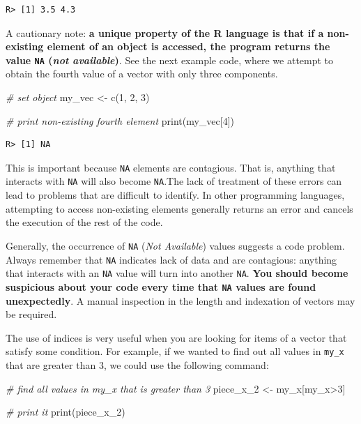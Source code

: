 \documentclass[
  12pt,
]{book}
\newenvironment{Shaded}{\begin{snugshade}}{\end{snugshade}}
\newcommand{\CommentTok}[1]{\textcolor[rgb]{0.37,0.37,0.37}{\textit{#1}}}
\newcommand{\DecValTok}[1]{\textcolor[rgb]{0.06,0.06,0.06}{#1}}
\newcommand{\FunctionTok}[1]{\textcolor[rgb]{0,0,0}{#1}}
\newcommand{\NormalTok}[1]{#1}
\newcommand{\OtherTok}[1]{\textcolor[rgb]{0.37,0.37,0.37}{#1}}
\newcommand{\SpecialCharTok}[1]{\textcolor[rgb]{0,0,0}{#1}}
\newenvironment{rmdimportant}
{\begin{importantblock}
		
	} {\end{importantblock}}
\begin{document}
\begin{verbatim}
R> [1] 3.5 4.3
\end{verbatim}

A cautionary note: \textbf{a unique property of the R language is that if a non-existing element of an object is accessed, the program returns the value \texttt{NA} (\emph{not available})}. See the next example code, where we attempt to obtain the fourth value of a vector with only three components.

\begin{Shaded}
\begin{Highlighting}[]
\CommentTok{\# set object}
\NormalTok{my\_vec }\OtherTok{\textless{}{-}} \FunctionTok{c}\NormalTok{(}\DecValTok{1}\NormalTok{, }\DecValTok{2}\NormalTok{, }\DecValTok{3}\NormalTok{)}

\CommentTok{\# print non{-}existing fourth element}
\FunctionTok{print}\NormalTok{(my\_vec[}\DecValTok{4}\NormalTok{])}
\end{Highlighting}
\end{Shaded}

\begin{verbatim}
R> [1] NA
\end{verbatim}

This is important because \texttt{NA} elements are contagious. That is, anything that interacts with \texttt{NA} will also become \texttt{NA}.The lack of treatment of these errors can lead to problems that are difficult to identify. In other programming languages, attempting to access non-existing elements generally returns an error and cancels the execution of the rest of the code.

\begin{rmdimportant}
Generally, the occurrence of \texttt{NA} (\emph{Not Available}) values
suggests a code problem. Always remember that \texttt{NA} indicates lack
of data and are contagious: anything that interacts with an \texttt{NA}
value will turn into another \texttt{NA}. \textbf{You should become
suspicious about your code every time that \texttt{NA} values are found
unexpectedly}. A manual inspection in the length and indexation of
vectors may be required.
\end{rmdimportant}

The use of indices is very useful when you are looking for items of a vector that satisfy some condition. For example, if we wanted to find out all values in \texttt{my\_x} that are greater than 3, we could use the following command:

\begin{Shaded}
\begin{Highlighting}[]
\CommentTok{\# find all values in my\_x that is greater than 3}
\NormalTok{piece\_x\_2 }\OtherTok{\textless{}{-}}\NormalTok{ my\_x[my\_x}\SpecialCharTok{\textgreater{}}\DecValTok{3}\NormalTok{]}

\CommentTok{\# print it}
\FunctionTok{print}\NormalTok{(piece\_x\_2)}
\end{Highlighting}
\end{Shaded}
\end{document}
